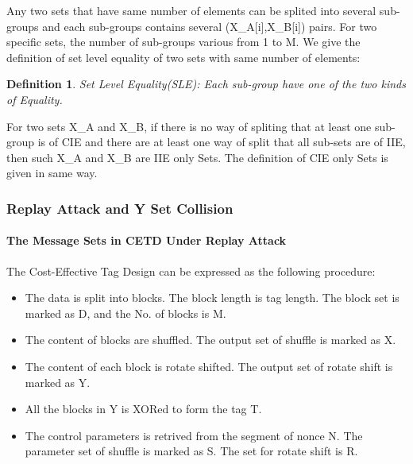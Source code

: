 \documentclass{article}
\newtheorem{defination}{Definition}[section]
\begin{document}
Any two sets that have same number of elements can be splited into several sub-groups and each sub-groups contains several (X\_A[i],X\_B[i]) pairs. For two specific sets, the number of sub-groups various from 1 to M. We give the definition of set level equality of two sets with same number of elements:
\begin{defination}
Set Level Equality(SLE): Each sub-group have one of the two kinds of Equality.
\end{defination}

For two sets X\_A and X\_B, if there is no way of spliting that at least one sub-group is of CIE and there are at least one way of split that all sub-sets are of IIE, then such X\_A and X\_B are IIE only Sets. 
The definition of CIE only Sets is given in same way.

\subsubsection{Replay Attack and Y Set Collision}
\paragraph{The Message Sets in CETD Under Replay Attack}
The Cost-Effective Tag Design can be expressed as the following procedure:
\begin{itemize}
	\item The data is split into blocks. The block length is tag length. The block set is marked as D, and the No. of blocks is M.
	\item The content of blocks are shuffled. The output set of shuffle is marked as X.
	\item The content of each block is rotate shifted. The output set of rotate shift is marked as Y.
	\item All the blocks in Y is XORed to form the tag T.
	\item The control parameters is retrived from the segment of nonce N. The parameter set of shuffle is marked as S. The set for rotate shift is R.
\end{itemize}
\end{document}
